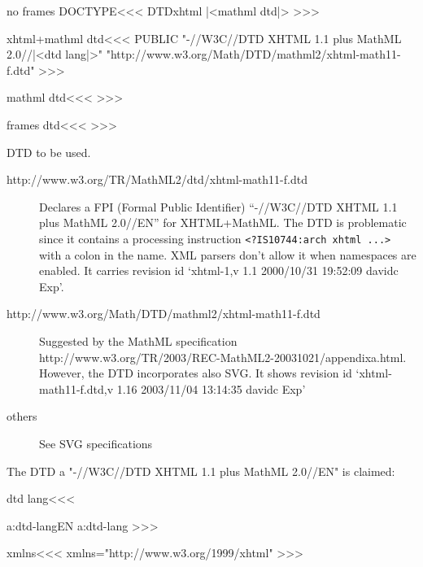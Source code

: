 \<no frames DOCTYPE\><<<
\def\:temp{xhtml}
\ifx \:DTD\:temp
   |<mathml dtd|>
\fi
>>>

% 

\<xhtml+mathml dtd\><<<
PUBLIC
     "-//W3C//DTD XHTML 1.1 plus MathML 2.0//|<dtd lang|>"\Hnewline
     "http://www.w3.org/Math/DTD/mathml2/xhtml-math11-f.dtd"
>>>

\<mathml dtd\><<<
>>>

\<frames dtd\><<<
   {}
>>>





DTD to be used.

\begin{description}



\item [http://www.w3.org/TR/MathML2/dtd/xhtml-math11-f.dtd]

Declares a  FPI (Formal Public Identifier)
``-//W3C//DTD XHTML 1.1 plus MathML 2.0//EN'' for XHTML+MathML. 
The DTD is problematic
since it contains a processing instruction
\verb!<?IS10744:arch xhtml ...>!  with a colon in the name. XML 
parsers don't allow it when namespaces are enabled. It carries 
revision id `xhtml-1,v 1.1 2000/10/31 19:52:09 davidc Exp'.

\item[http://www.w3.org/Math/DTD/mathml2/xhtml-math11-f.dtd]

Suggested by the MathML 
specification
 http://www.w3.org/TR/2003/REC-MathML2-20031021/appendixa.html.  However, the
DTD incorporates also SVG.  It shows revision id
`xhtml-math11-f.dtd,v 1.16 2003/11/04 13:14:35 davidc Exp'

\item [others]

See SVG specifications
\end{description}

The DTD 
a   "-//W3C//DTD XHTML 1.1 plus MathML 
2.0//EN" is claimed: 





\<dtd lang\><<<
\expandafter
\ifx \csname a:dtd-lang\endcsname\relax EN\else
  \csname a:dtd-lang\endcsname
\fi
>>>


\<xmlns\><<<
xmlns="http://www.w3.org/1999/xhtml"
>>>









